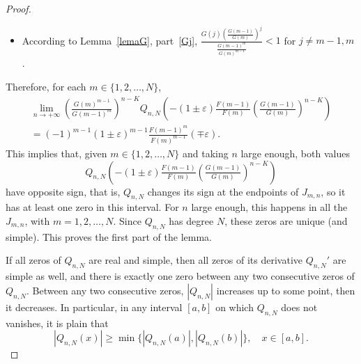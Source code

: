 \documentclass[10pt, a4paper, leqno]{amsart}
\numberwithin{equation}{section}
\theoremstyle{plain}
\theoremstyle{remark}
\newcommand{\eps}{\varepsilon}
\begin{document}
\begin{proof}
\begin{itemize}
\item According to Lemma~\ref{lemaG}, part~\eqref{Gj}, $\frac{G(j) \left(\tfrac{G(m-1)}{G(m)}\right)^j}
  {\tfrac{G(m-1)^m}{G(m)^{m-1}}} < 1$ for $j \ne m-1, m$.
\end{itemize}
Therefore, for each $m \in \{1,2,\dots,N\}$,
\begin{multline}
\label{limQnM}
  \lim_{n\to +\infty} \left( \tfrac{G(m)^{m-1}}{G(m-1)^m} \right)^{n-K} 
  Q_{n,N}\left( -(1\pm \eps) \tfrac{F(m-1)}{F(m)} 
  \left( \tfrac{G(m-1)}{G(m)} \right)^{n-K} \right)
  \\
  = (-1)^{m-1} (1\pm \eps)^{m-1} \tfrac{F(m-1)^m}{F(m)^{m-1}}
  (\mp \eps).
\end{multline}
This implies that, given $m \in \{1,2,\dots,N\}$ and taking $n$ large enough, both values
\begin{equation}
\label{QImndistintosigno}
  Q_{n,N}\left( -(1\pm \eps) \tfrac{F(m-1)}{F(m)} \left( \tfrac{G(m-1)}{G(m)} \right)^{n-K} \right)
\end{equation}
have opposite sign, that is, $Q_{n,N}$ changes its sign at the endpoints of $J_{m,n}$, so it has at least one zero in this interval. For $n$ large enough, this happens in all the $J_{m,n}$, with $m=1,2,\dots,N$. Since $Q_{n,N}$ has degree $N$, these zeros are unique (and simple). This proves the first part of the lemma.

If all zeros of $Q_{n,N}$ are real and simple, then all zeros of its derivative $Q_{n,N}'$ are simple as well, and there is exactly one zero between any two consecutive zeros of $Q_{n,N}$. Between any two consecutive zeros, $|Q_{n,N}|$ increases up to some point, then it decreases. In particular, in any interval $[a,b]$ on which $Q_{n,N}$ does not vanishes, it is plain that
\[
  |Q_{n,N}(x)| \ge \min\{ |Q_{n,N}(a)|, |Q_{n,N}(b)|\},
  \quad x \in [a,b].
\]


\end{proof}
\end{document}
